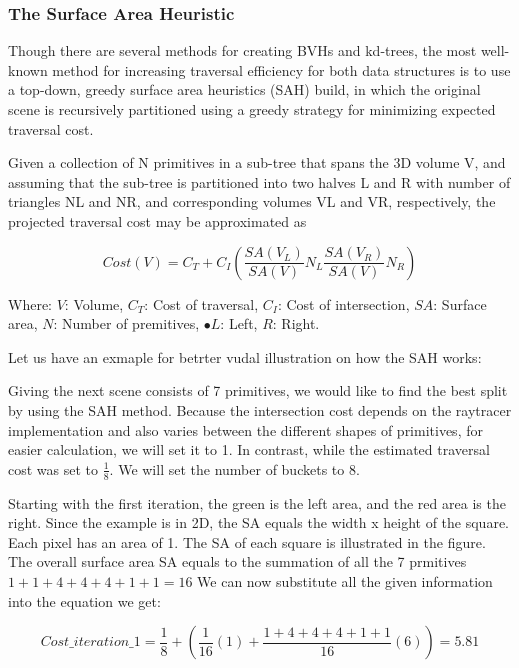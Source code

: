 \documentclass[11pt,a4paper]{article}
\begin{document}
\subsubsection{The Surface Area Heuristic}
Though there are several methods for creating BVHs and kd-trees, the most well-known method for increasing traversal efficiency for both data structures is to use a top-down, greedy surface area heuristics (SAH) build, in which the original scene is recursively partitioned using a greedy strategy for minimizing expected traversal cost. 
\\
\noindent

Given a collection of N primitives in a sub-tree that spans the 3D volume V, and assuming that the sub-tree is partitioned into two halves L and R with number of triangles NL and NR, and corresponding volumes VL and VR, respectively, the projected traversal cost may be approximated as

\begin{equation}
Cost(V) = C_T + C_I(\frac{SA(V_L)}{SA(V)}N_L \frac{SA(V_R)}{SA(V)}N_R)
\end{equation}

Where: $V$: Volume, $C_T$: Cost of traversal, $C_I$: Cost of intersection, $SA$: Surface area, $N$: Number of premitives, $•L$: Left, $R$: Right.
\\
\noindent

Let us have an exmaple for betrter vudal illustration on how the SAH works: 

Giving the next scene consists of 7 primitives, we would like to find the best split by using the SAH method. Because the intersection cost depends on the raytracer implementation and also varies between the different shapes of primitives, for easier calculation, we will set it to 1. In contrast, while the estimated traversal cost was set to $\frac{1}{8}$. We will set the number of buckets to 8.
\\
\noindent

Starting with the first iteration, the green is the left area, and the red area is the right. Since the example is in 2D, the SA equals the width x height of the square. Each pixel has an area of 1. The SA of each square is illustrated in the figure. The overall surface area SA equals to the summation of all the 7 prmitives $1+1+4+4+4+1+1 = 16$ We can now substitute all the given information into the equation we get: 


\begin{equation}
Cost\_iteration\_1 =  \frac{1}{8} + (\frac{1}{16}(1) +\frac{1+4+4+4+1+1}{16}(6)) = 5.81
\end{equation}
\end{document}
